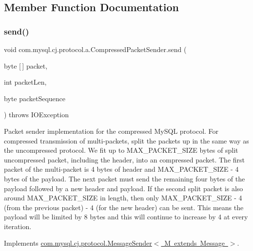 \subsection{Member Function Documentation}
\mbox{\label{classcom_1_1mysql_1_1cj_1_1protocol_1_1a_1_1_compressed_packet_sender_a643c7e9a053e2704786f8319ef8a06e7}} 
\subsubsection{\texorpdfstring{send()}{send()}}
{\footnotesize\ttfamily void com.\+mysql.\+cj.\+protocol.\+a.\+Compressed\+Packet\+Sender.\+send (\begin{DoxyParamCaption}\item[{byte \mbox{[}$\,$\mbox{]}}]{packet,  }\item[{int}]{packet\+Len,  }\item[{byte}]{packet\+Sequence }\end{DoxyParamCaption}) throws I\+O\+Exception}

Packet sender implementation for the compressed My\+S\+QL protocol. For compressed transmission of multi-\/packets, split the packets up in the same way as the uncompressed protocol. We fit up to M\+A\+X\+\_\+\+P\+A\+C\+K\+E\+T\+\_\+\+S\+I\+ZE bytes of split uncompressed packet, including the header, into an compressed packet. The first packet of the multi-\/packet is 4 bytes of header and M\+A\+X\+\_\+\+P\+A\+C\+K\+E\+T\+\_\+\+S\+I\+ZE -\/ 4 bytes of the payload. The next packet must send the remaining four bytes of the payload followed by a new header and payload. If the second split packet is also around M\+A\+X\+\_\+\+P\+A\+C\+K\+E\+T\+\_\+\+S\+I\+ZE in length, then only M\+A\+X\+\_\+\+P\+A\+C\+K\+E\+T\+\_\+\+S\+I\+ZE -\/ 4 (from the previous packet) -\/ 4 (for the new header) can be sent. This means the payload will be limited by 8 bytes and this will continue to increase by 4 at every iteration. 

Implements \mbox{\hyperlink{interfacecom_1_1mysql_1_1cj_1_1protocol_1_1_message_sender_a0c7192449eae4aa0f0dbbc9778dac002}{com.\+mysql.\+cj.\+protocol.\+Message\+Sender$<$ M extends Message $>$}}.

